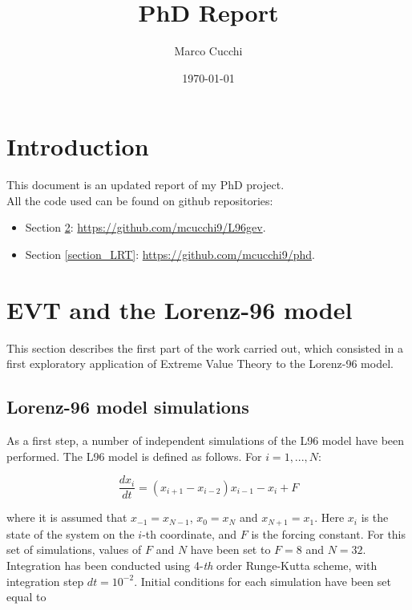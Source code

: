 \documentclass{article}
\title{PhD Report}
\author{Marco Cucchi}
\date{\today}
\begin{document}
\maketitle
\tableofcontents
\newpage

\section{Introduction}

This document is an updated report of my PhD project. \\
All the code used can be found on github repositories:
\begin{itemize}
	\item Section \ref{section_EVT}: \url{https://github.com/mcucchi9/L96gev}.
	\item Section \ref{section_LRT}: \url{https://github.com/mcucchi9/phd}.
\end{itemize}
 

\section{EVT and the Lorenz-96 model} \label{section_EVT}

This section describes the first part of the work carried out, which consisted in a first exploratory application of Extreme Value Theory \cite{Coles} to the Lorenz-96 model.

\subsection{Lorenz-96 model simulations} \label{gev_sim}

As a first step, a number of independent simulations of the L96 model have been performed.
The L96 model is defined as follows. For $i=1,...,N$:

\begin{equation}
\frac{dx_i}{dt} = (x_{i+1}-x_{i-2})x_{i-1} - x_i + F
\end{equation}

where it is assumed that $x_{-1}=x_{N-1}$, $x_0 = x_N$ and $x_{N+1}=x_1$. Here $x_i$ is the state of the system on the $i$-th coordinate, and $F$ is the forcing constant.
For this set of simulations, values of $F$ and $N$ have been set to $F=8$ and $N=32$.\\
Integration has been conducted using 4-\textit{th} order Runge-Kutta scheme, with integration step $dt=10^{-2}$. Initial conditions for each simulation have been set equal to
\end{document}
